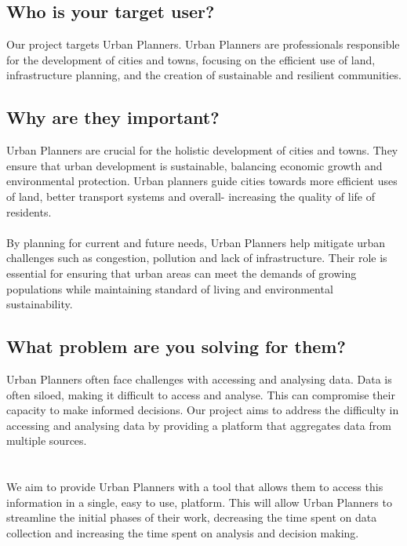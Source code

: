 \subsection{Who is your target user?}

Our project targets Urban Planners. Urban Planners are professionals responsible for the development of cities and towns, focusing on the efficient use of land,
infrastructure planning, and the creation of sustainable and resilient communities.

\subsection{Why are they important?}

Urban Planners are crucial for the holistic development of cities and towns. They ensure that urban development is sustainable, balancing economic growth and
environmental protection. Urban planners guide cities towards more efficient uses of land, better transport systems and overall- increasing the quality of life
of residents. 
\\ \\
By planning for current and future needs, Urban Planners help mitigate urban challenges such as congestion, pollution and lack of infrastructure.
Their role is essential for ensuring that urban areas can meet the demands of growing populations while maintaining standard of living and environmental sustainability.

\subsection{What problem are you solving for them?}

Urban Planners often face challenges with accessing and analysing data. Data is often siloed, making it difficult to access and analyse. This can compromise their capacity
to make informed decisions. Our project aims to address the difficulty in accessing and analysing data by providing a platform that aggregates data from multiple sources.
\\ \\ \\
We aim to provide Urban Planners with a tool that allows them to access this information in a single, easy to use, platform. This will allow Urban Planners to streamline
the initial phases of their work, decreasing the time spent on data collection and increasing the time spent on analysis and decision making.
